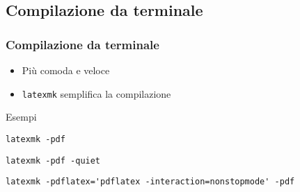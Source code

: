 \subsection{Compilazione da terminale}
\begin{frame}[fragile]
 \frametitle{Compilazione da terminale}
 
 \begin{itemize}
  \item Più comoda e veloce
  \item \texttt{latexmk} semplifica la compilazione
 \end{itemize}

 \begin{exampleblock}{Esempi}
        \begin{lstlisting}[frame = single, title={Compilare un pdf}] 
latexmk -pdf
        \end{lstlisting}

        \begin{lstlisting}[frame = single, title={Compilare un pdf con poco 
output}] 
latexmk -pdf -quiet
        \end{lstlisting}
        
        \begin{lstlisting}[frame = single, title={Specificare opzioni al 
compilatore}] 
latexmk -pdflatex='pdflatex -interaction=nonstopmode' -pdf
        \end{lstlisting}
 \end{exampleblock}

\end{frame}
